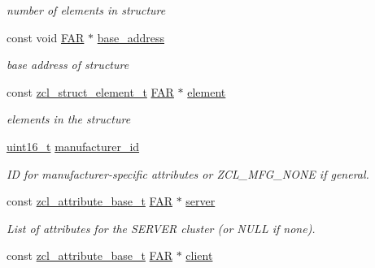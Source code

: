 \begin{DoxyCompactItemize}
\begin{DoxyCompactList}\small\item\em number of elements in structure \end{DoxyCompactList}\item 
\hypertarget{group__zcl_ga2c4fcaeccedd1b62207f9bb03a26fdf1}{const void \hyperlink{group__hal_gaef060b3456fdcc093a7210a762d5f2ed}{F\-A\-R} $\ast$ \hyperlink{group__zcl_ga2c4fcaeccedd1b62207f9bb03a26fdf1}{base\-\_\-address}}\label{group__zcl_ga2c4fcaeccedd1b62207f9bb03a26fdf1}

\begin{DoxyCompactList}\small\item\em base address of structure \end{DoxyCompactList}\item 
\hypertarget{group__zcl_gacfb513b58d4138fe737df9448fb52e5a}{const \hyperlink{structzcl__struct__element__t}{zcl\-\_\-struct\-\_\-element\-\_\-t} \hyperlink{group__hal_gaef060b3456fdcc093a7210a762d5f2ed}{F\-A\-R} $\ast$ \hyperlink{group__zcl_gacfb513b58d4138fe737df9448fb52e5a}{element}}\label{group__zcl_gacfb513b58d4138fe737df9448fb52e5a}

\begin{DoxyCompactList}\small\item\em elements in the structure \end{DoxyCompactList}\item 
\hypertarget{group__zcl_ga4ad31fcb69f8aaca8f3c1820bb4d8594}{\hyperlink{group__hal_ga5a8b2dc9e45a9ee81a94ef304fb62505}{uint16\-\_\-t} \hyperlink{group__zcl_ga4ad31fcb69f8aaca8f3c1820bb4d8594}{manufacturer\-\_\-id}}\label{group__zcl_ga4ad31fcb69f8aaca8f3c1820bb4d8594}

\begin{DoxyCompactList}\small\item\em I\-D for manufacturer-\/specific attributes or Z\-C\-L\-\_\-\-M\-F\-G\-\_\-\-N\-O\-N\-E if general. \end{DoxyCompactList}\item 
\hypertarget{group__zcl_ga711c76cba8f7c0f30a95dcc5f7c0b7fb}{const \hyperlink{structzcl__attribute__base__t}{zcl\-\_\-attribute\-\_\-base\-\_\-t} \hyperlink{group__hal_gaef060b3456fdcc093a7210a762d5f2ed}{F\-A\-R} $\ast$ \hyperlink{group__zcl_ga711c76cba8f7c0f30a95dcc5f7c0b7fb}{server}}\label{group__zcl_ga711c76cba8f7c0f30a95dcc5f7c0b7fb}

\begin{DoxyCompactList}\small\item\em List of attributes for the S\-E\-R\-V\-E\-R cluster (or N\-U\-L\-L if none). \end{DoxyCompactList}\item 
\hypertarget{group__zcl_gabb37e65dc5e6f9179ff1c17268031d9b}{const \hyperlink{structzcl__attribute__base__t}{zcl\-\_\-attribute\-\_\-base\-\_\-t} \hyperlink{group__hal_gaef060b3456fdcc093a7210a762d5f2ed}{F\-A\-R} $\ast$ \hyperlink{group__zcl_gabb37e65dc5e6f9179ff1c17268031d9b}{client}}\label{group__zcl_gabb37e65dc5e6f9179ff1c17268031d9b}


\end{DoxyCompactItemize}
